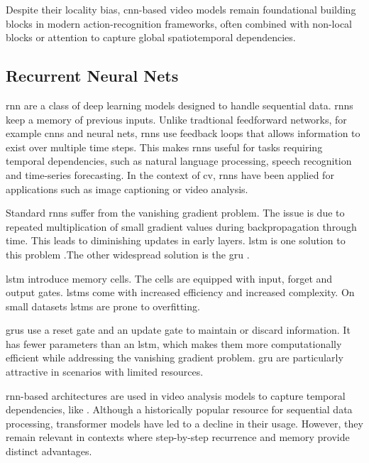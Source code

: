 Despite their locality bias, \acrshort{cnn}-based video models remain foundational building blocks in modern action-recognition frameworks, often combined with non-local blocks or attention to capture global spatiotemporal dependencies.
 


\subsection{Recurrent Neural Nets}

\acrfull{rnn} are a class of deep learning models designed to handle sequential data. \acrshort{rnn}s keep a memory of previous inputs. Unlike tradtional feedforward networks, for example \acrshort{cnn}s and neural nets, \acrshort{rnn}s use feedback loops that allows information to exist over multiple time steps.  This makes \acrshort{rnn}s useful for tasks requiring temporal dependencies, such as natural language processing, speech recognition and time-series forecasting\cite{ibm_rnn_2025}. In the context of \acrfull{cv}, \acrshort{rnn}s have been applied for applications such as image captioning or video analysis. 

Standard \acrshort{rnn}s suffer from the vanishing gradient problem. The issue is due to repeated multiplication of small gradient values during backpropagation through time. This leads to diminishing updates in early layers. \acrfull{lstm} is one solution to this problem \cite{bhogal_human_2023, kumar_human_2023, mahaseni_spotting_2021}.The other widespread solution is the \acrfull{gru} \cite{giveki_human_2024,li_oarnet_2024,yu_i3d_2023}. 

\acrlong{lstm} introduce memory cells. The cells are equipped with input, forget and output gates. \acrshort{lstm}s come with increased efficiency and increased complexity. On small datasets \acrshort{lstm}s are prone to overfitting. 

\acrlong{gru}s use a reset gate and an update gate to maintain or discard information. It has fewer parameters than an \acrshort{lstm}, which makes them more computationally efficient while addressing the vanishing gradient problem. \acrshort{gru} are particularly attractive in scenarios with limited resources. 

\acrshort{rnn}-based architectures are used in video analysis models to capture temporal dependencies, like \textcite{bhogal_human_2023}. Although a historically popular resource for sequential data processing, transformer models have led to a decline in their usage. However, they remain relevant in contexts where step-by-step recurrence and memory provide distinct advantages\cite{ibm_rnn_2025}.

